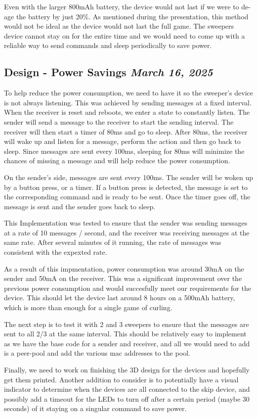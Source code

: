 \documentclass{article}
\newcommand{\logbookentry}[2]{
    \subsection*{#1 \hfill \textit{#2}} 
}
\begin{document}
Even with the larger 800mAh battery, the device would not last if we were to de-age the battery by just 20\%. As mentioned during the presentation, this method would not be ideal as the device would not last the full game. The sweepers device cannot stay on for the entire time and we would need to come up with a reliable way to send commands and sleep periodically to save power.

\logbookentry{Design - Power Savings}{March 16, 2025}
To help reduce the power consumption, we need to have it so the sweeper's device is not always listening. This was achieved by sending messages at a fixed interval. When the receiver is reset and reboots, we enter a state to constantly listen. The sender will send a message to the receiver to start the sending interval. The receiver will then start a timer of 80ms and go to sleep. After 80ms, the receiver will wake up and listen for a message, perform the action and then go back to sleep. Since messages are sent every 100ms, sleeping for 80ms will minimize the chances of missing a message and will help reduce the power consumption.

On the sender's side, messages are sent every 100ms. The sender will be woken up by a button press, or a timer. If a button press is detected, the message is set to the corresponding command and is ready to be sent. Once the timer goes off, the message is sent and the sender goes back to sleep. 

This Implementation was tested to ensure that the sender was sending messages at a rate of 10 messages / second, and the receiver was receiving messages at the same rate. After several minutes of it running, the rate of messages was consistent with the expexted rate. 

As a result of this impmentation, power consumption was around 30mA on the sender and 50mA on the receiver. This was a significant improvement over the previous power consumption and would succesfully meet our requirements for the device. This should let the device last around 8 hours on a 500mAh battery, which is more than enough for a single game of curling.

The next step is to test it with 2 and 3 sweepers to ensure that the messages are sent to all 2/3 at the same interval. This should be relatively easy to implement as we have the base code for a sender and receiver, and all we would need to add is a peer-pool and add the various mac addresses to the pool.

Finally, we need to work on finishing the 3D design for the devices and hopefully get them printed. Another addition to consider is to potentially have a visual indicator to determine when the devices are all connected to the skip device, and possibly add a timeout for the LEDs to turn off after a certain period (maybe 30 seconds) of it staying on a singular command to save power.
\end{document}

